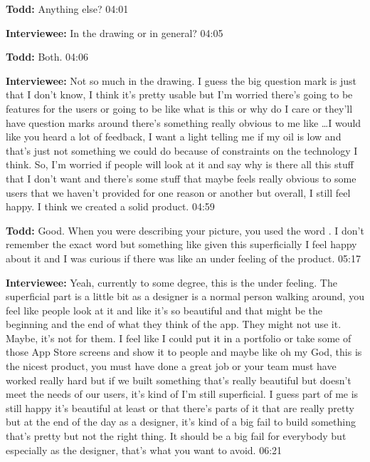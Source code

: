 \textbf{Todd:} Anything else?  04:01

\textbf{Interviewee:} In the drawing or in general?  04:05

\textbf{Todd:} Both.  04:06

\textbf{Interviewee:} Not so much in the drawing.  I guess the big question mark is just that I don't know, I think it's pretty usable but I'm worried there's going to be features for the users or going to be like what is this or why do I care or they'll have question marks around there's something really obvious to me like \ldots I would like you heard a lot of feedback, I want a light telling me if my oil is low and that's just not something we could do because of constraints on the technology I think.  So, I'm worried if people will look at it and say why is there all this stuff that I don't want and there's some stuff that maybe feels really obvious to some users that we haven't provided for one reason or another but overall, I still feel happy.  I think we created a solid product.  04:59

\textbf{Todd:} Good.  When you were describing your  picture, you used the word .  I don't remember the exact word but something like given this superficially I feel happy about it and I was curious if there was like an under feeling of the product.  05:17

\textbf{Interviewee:} Yeah, currently to some degree, this is the under feeling.  The superficial part is a little bit as a designer is a normal person walking around, you feel like people look at it and like it's so beautiful and that might be the beginning and the end of what they think of the app.  They might not use it.  Maybe, it's not for them.  I feel like I could put it in a portfolio or take some of those App Store screens and show it to people and maybe like oh my God, this is the nicest product, you must have done a great job or your team must have worked really hard but if we built something that's really beautiful but doesn't meet the needs of our users, it's kind of I'm still superficial.  I guess part of me is still happy it's beautiful at least or that there's parts of it that are really pretty but at the end of the day as a designer, it's kind of a big fail to build something that's pretty but not the right thing.  It should be a big fail for everybody but especially as the designer, that's what you want to avoid.  06:21